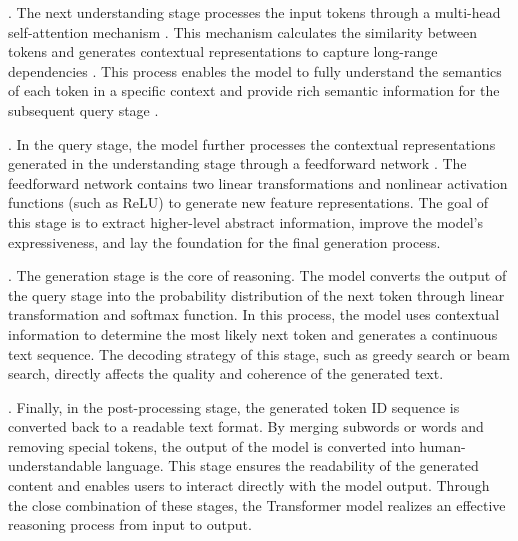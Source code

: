 . The next understanding stage processes the input tokens through a multi-head self-attention mechanism \cite{vaswani2017attention, chefer2021transformer, vig2019analyzing}. This mechanism calculates the similarity between tokens and generates contextual representations to capture long-range dependencies \cite{yeh2023attentionviz}. This process enables the model to fully understand the semantics of each token in a specific context and provide rich semantic information for the subsequent query stage \cite{rigotti2021attention, chefer2021transformer}.

. In the query stage, the model further processes the contextual representations generated in the understanding stage through a feedforward network \cite{zhao2024explainability, meng2023locating}. The feedforward network contains two linear transformations and nonlinear activation functions (such as ReLU) to generate new feature representations. The goal of this stage is to extract higher-level abstract information, improve the model's expressiveness, and lay the foundation for the final generation process.

. The generation stage is the core of reasoning. The model converts the output of the query stage into the probability distribution of the next token through linear transformation and softmax function. In this process, the model uses contextual information to determine the most likely next token and generates a continuous text sequence. The decoding strategy of this stage, such as greedy search or beam search, directly affects the quality and coherence of the generated text.

. Finally, in the post-processing stage, the generated token ID sequence is converted back to a readable text format. By merging subwords or words and removing special tokens, the output of the model is converted into human-understandable language. This stage ensures the readability of the generated content and enables users to interact directly with the model output. Through the close combination of these stages, the Transformer model realizes an effective reasoning process from input to output.